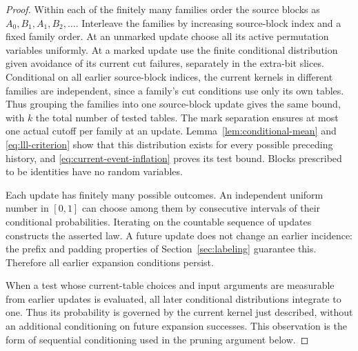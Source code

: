 \begin{proof}
Within each of the finitely many families order the source blocks
as $A_0,B_1,A_1,B_2,\ldots$.  Interleave the families by increasing
source-block index and a fixed family order.  At an unmarked
update choose all its active permutation variables uniformly.
At a marked update use the finite conditional distribution given
avoidance of its current cut failures, separately in the extra-bit
slices.  Conditional on all earlier source-block indices, the
current kernels in different families are independent, since a
family's cut conditions use only its own tables.  Thus grouping
the families into one source-block update gives the same bound,
with $k$ the total number of tested tables.  The mark separation
ensures at most one actual cutoff
per family at an update.  Lemma~\ref{lem:conditional-mean} and
\eqref{eq:lll-criterion} show that this distribution exists for
every possible preceding history, and
\eqref{eq:current-event-inflation} proves its test bound.  Blocks
prescribed to be identities have no random variables.

Each update has finitely many possible outcomes.  An independent
uniform number in $[0,1]$ can choose among them by consecutive
intervals of their conditional probabilities.  Iterating on the
countable sequence of updates constructs the asserted law.  A
future update does not change an earlier incidence: the prefix
and padding properties of Section~\ref{sec:labeling} guarantee
this.  Therefore all earlier expansion conditions persist.

When a test whose current-table choices and input arguments are
measurable from earlier updates is evaluated, all
later conditional distributions integrate to one.  Thus its
probability is governed by the current kernel just described,
without an additional conditioning on future expansion successes.
This observation is the form of sequential conditioning used
in the pruning argument below.
\end{proof}
